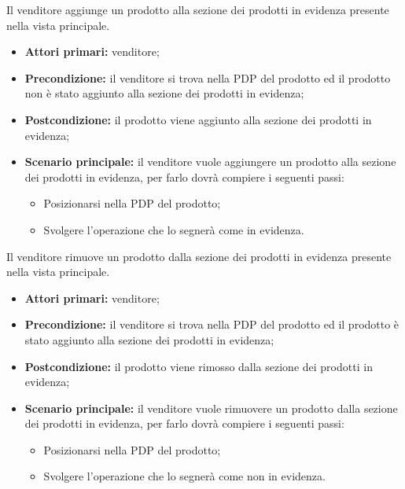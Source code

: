 Il venditore aggiunge un prodotto alla sezione dei prodotti in evidenza presente nella vista principale.
\begin{itemize}
    \item \textbf{Attori primari:} venditore;
    \item \textbf{Precondizione:} il venditore si trova nella PDP del prodotto ed il prodotto non è stato aggiunto alla sezione dei prodotti in evidenza;
    \item \textbf{Postcondizione:} il prodotto viene aggiunto alla sezione dei prodotti in evidenza;
    \item \textbf{Scenario principale:} il venditore vuole aggiungere un prodotto alla sezione dei prodotti in evidenza, per farlo dovrà compiere i seguenti passi:
    \begin{itemize}
        \item Posizionarsi nella PDP del prodotto;
        \item Svolgere l'operazione che lo segnerà come in evidenza.
    \end{itemize}
\end{itemize}

Il venditore rimuove un prodotto dalla sezione dei prodotti in evidenza presente nella vista principale.
\begin{itemize}
    \item \textbf{Attori primari:} venditore;
    \item \textbf{Precondizione:} il venditore si trova nella PDP del prodotto ed il prodotto è stato aggiunto alla sezione dei prodotti in evidenza;
    \item \textbf{Postcondizione:} il prodotto viene rimosso dalla sezione dei prodotti in evidenza; 
    \item \textbf{Scenario principale:} il venditore vuole rimuovere un prodotto dalla sezione dei prodotti in evidenza, per farlo dovrà compiere i seguenti passi:
    \begin{itemize}
        \item Posizionarsi nella PDP del prodotto;
        \item Svolgere l'operazione che lo segnerà come non in evidenza.
    \end{itemize}
\end{itemize}


